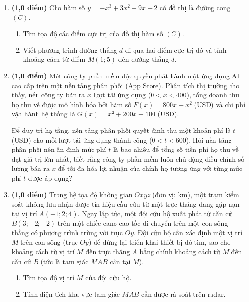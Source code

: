 \documentclass[12pt]{article}
\begin{document}
	\begin{enumerate}[label=\textbf{Bài \arabic*.}, leftmargin=*]
		
		\item \textbf{(1,0 điểm)} Cho hàm số $y = -x^3 + 3x^2 + 9x - 2$ có đồ thị là đường cong $(C)$. 
		\begin{enumerate}[label=\alph*)]
			\item Tìm tọa độ các điểm cực trị của đồ thị hàm số $(C)$.
			\item Viết phương trình đường thẳng $d$ đi qua hai điểm cực trị đó và tính khoảng cách từ điểm $M(1; 5)$ đến đường thẳng $d$.
		\end{enumerate}
		\vspace{2mm}
		
		\item \textbf{(1,0 điểm)} Một công ty phần mềm độc quyền phát hành một ứng dụng AI cao cấp trên một nền tảng phân phối (App Store). Phân tích thị trường cho thấy, nếu công ty bán ra $x$ lượt tải ứng dụng ($0 < x < 400$), tổng doanh thu họ thu về được mô hình hóa bởi hàm số $F(x) = 800x - x^2$ (USD) và chi phí vận hành hệ thống là $G(x) = x^2 + 200x + 100$ (USD). 
		
		Để duy trì hạ tầng, nền tảng phân phối quyết định thu một khoản phí là $t$ (USD) cho mỗi lượt tải ứng dụng thành công ($0 < t < 600$). Hỏi nền tảng phân phối nên ấn định mức phí $t$ là bao nhiêu để tổng số tiền phí họ thu về đạt giá trị lớn nhất, biết rằng công ty phần mềm luôn chủ động điều chỉnh số lượng bán ra $x$ để tối đa hóa lợi nhuận của chính họ tương ứng với từng mức phí $t$ được áp dụng?
		\vspace{2mm}
		
		\item \textbf{(1,0 điểm)} Trong hệ tọa độ không gian $Oxyz$ (đơn vị: km), một trạm kiểm soát không lưu nhận được tín hiệu cầu cứu từ một trực thăng đang gặp nạn tại vị trí $A(-1; 2; 4)$. Ngay lập tức, một đội cứu hộ xuất phát từ căn cứ $B(3; -2; -2)$ trên một chiếc cano cao tốc di chuyển trên một con sông thẳng có phương trình trùng với trục $Oy$. Đội cứu hộ cần xác định một vị trí $M$ trên con sông (trục $Oy$) để dừng lại triển khai thiết bị dò tìm, sao cho khoảng cách từ vị trí $M$ đến trực thăng $A$ bằng chính khoảng cách từ $M$ đến căn cứ $B$ (tức là tam giác $MAB$ cân tại $M$). 
		\begin{enumerate}[label=\alph*)]
			\item Tìm tọa độ vị trí $M$ của đội cứu hộ.
			\item Tính diện tích khu vực tam giác $MAB$ cần được rà soát trên radar.
		\end{enumerate}
		
	\end{enumerate}
	
\end{document}
